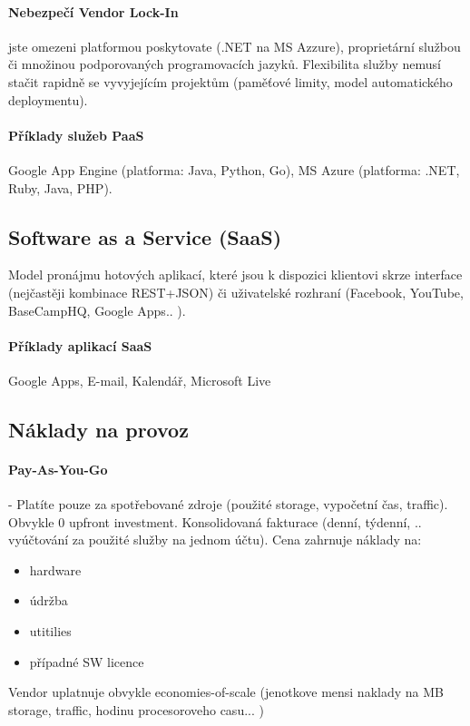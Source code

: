 \paragraph{Nebezpečí Vendor Lock-In} jste omezeni platformou poskytovate (.NET na MS Azzure), proprietární službou či množinou podporovaných programovacích jazyků. Flexibilita služby nemusí stačit rapidně se vyvyjejícím projektům (paměťové limity, model automatického deploymentu).

\paragraph{Příklady služeb PaaS} Google App Engine (platforma: Java, Python, Go), MS Azure (platforma: .NET, Ruby, Java, PHP).

\subsection{Software as a Service (SaaS)}
Model pronájmu hotových aplikací, které jsou k dispozici klientovi skrze interface (nejčastěji kombinace REST+JSON) či uživatelské rozhraní (Facebook, YouTube, BaseCampHQ, Google Apps.. ).
\paragraph{Příklady aplikací SaaS} Google Apps, E-mail, Kalendář, Microsoft Live

\subsection{Náklady na provoz}
\paragraph{Pay-As-You-Go} - Platíte pouze za spotřebované zdroje (použité storage, vypočetní čas, traffic). Obvykle 0 upfront investment. Konsolidovaná fakturace (denní, týdenní, .. vyúčtování za použité služby na jednom účtu). Cena zahrnuje náklady na:
\begin{itemize}[itemsep=0px]
\item hardware
\item údržba
\item utitilies
\item případné SW licence
\end{itemize}
Vendor uplatnuje obvykle economies-of-scale (jenotkove mensi naklady na MB storage, traffic, hodinu procesoroveho casu... )

